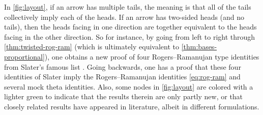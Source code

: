 \documentclass[reqno,11pt]{amsart}
\theoremstyle{definition}
\theoremstyle{remark}
\newtheorem*{remark}{Remark}
\numberwithin{equation}{section}
\begin{document}
In \cref{fig:layout}, if an arrow has multiple tails, the meaning is that all of the tails collectively imply each of the heads. If an arrow has two-sided heads (and no tails), then the heads facing in one direction are together equivalent to the heads facing in the other direction. So for instance, by going from left to right through \cref{thm:twisted-rog-ram} (which is ultimately equivalent to \cref{thm:bases-proportional}), one obtains a new proof of four Rogers--Ramanujan type identities from Slater's famous list \cite[(94),(96),(98),(99)]{slater1952further}. Going backwards, one has a proof that these four identities of Slater imply the Rogers--Ramanujan identities \cref{eq:rog-ram} and several mock theta identities. Also, some nodes in \cref{fig:layout} are colored with a lighter green to indicate that the results therein are only partly new, or that closely related results have appeared in literature, albeit in different formulations.

\end{document}

